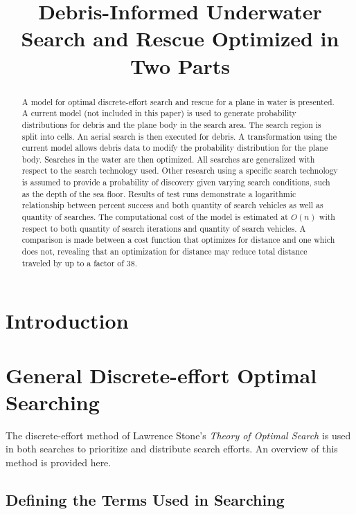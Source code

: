 \documentclass[a4paper]{article}
\title{Debris-Informed Underwater Search and Rescue Optimized in Two Parts}
\author{}
\date{}
\begin{document}
\maketitle

\begin{abstract}
A model for optimal discrete-effort search and rescue for a plane in water is presented. A current model (not included in this paper) is used to generate probability distributions for debris and the plane body in the search area. The search region is split into cells. An aerial search is then executed for debris. A transformation using the current model allows debris data to modify the probability distribution for the plane body. Searches in the water are then optimized. All searches are generalized with respect to the search technology used. Other research using a specific search technology is assumed to provide a probability of discovery given varying search conditions, such as the depth of the sea floor. Results of test runs demonstrate a logarithmic relationship between percent success and both quantity of search vehicles as well as quantity of searches. The computational cost of the model is estimated at $O(n)$ with respect to both quantity of search iterations and quantity of search vehicles. A comparison is made between a cost function that optimizes for distance and one which does not, revealing that an optimization for distance may reduce total distance traveled by up to a factor of 38.
\end{abstract}

\pagebreak 

\section{Introduction}


\section{General Discrete-effort Optimal Searching}

The discrete-effort method of Lawrence Stone's \textit{Theory of Optimal Search} is used in both searches to prioritize and distribute search efforts. An overview of this method is provided here. 

\subsection{Defining the Terms Used in Searching}
\end{document}

